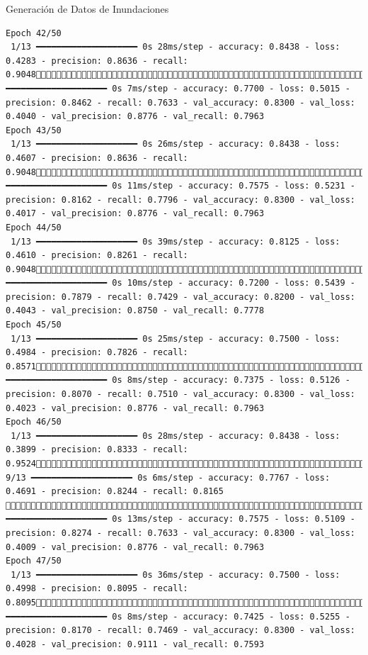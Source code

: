 \documentclass[
  ignorenonframetext,
]{beamer}
\begin{document}
\begin{frame}[fragile]{Generación de Datos de Inundaciones}
\begin{verbatim}
Epoch 42/50
 1/13 ━━━━━━━━━━━━━━━━━━━━ 0s 28ms/step - accuracy: 0.8438 - loss: 0.4283 - precision: 0.8636 - recall: 0.904813/13 ━━━━━━━━━━━━━━━━━━━━ 0s 7ms/step - accuracy: 0.7700 - loss: 0.5015 - precision: 0.8462 - recall: 0.7633 - val_accuracy: 0.8300 - val_loss: 0.4040 - val_precision: 0.8776 - val_recall: 0.7963
Epoch 43/50
 1/13 ━━━━━━━━━━━━━━━━━━━━ 0s 26ms/step - accuracy: 0.8438 - loss: 0.4607 - precision: 0.8636 - recall: 0.904813/13 ━━━━━━━━━━━━━━━━━━━━ 0s 11ms/step - accuracy: 0.7575 - loss: 0.5231 - precision: 0.8162 - recall: 0.7796 - val_accuracy: 0.8300 - val_loss: 0.4017 - val_precision: 0.8776 - val_recall: 0.7963
Epoch 44/50
 1/13 ━━━━━━━━━━━━━━━━━━━━ 0s 39ms/step - accuracy: 0.8125 - loss: 0.4610 - precision: 0.8261 - recall: 0.904813/13 ━━━━━━━━━━━━━━━━━━━━ 0s 10ms/step - accuracy: 0.7200 - loss: 0.5439 - precision: 0.7879 - recall: 0.7429 - val_accuracy: 0.8200 - val_loss: 0.4043 - val_precision: 0.8750 - val_recall: 0.7778
Epoch 45/50
 1/13 ━━━━━━━━━━━━━━━━━━━━ 0s 25ms/step - accuracy: 0.7500 - loss: 0.4984 - precision: 0.7826 - recall: 0.857113/13 ━━━━━━━━━━━━━━━━━━━━ 0s 8ms/step - accuracy: 0.7375 - loss: 0.5126 - precision: 0.8070 - recall: 0.7510 - val_accuracy: 0.8300 - val_loss: 0.4023 - val_precision: 0.8776 - val_recall: 0.7963
Epoch 46/50
 1/13 ━━━━━━━━━━━━━━━━━━━━ 0s 28ms/step - accuracy: 0.8438 - loss: 0.3899 - precision: 0.8333 - recall: 0.9524 9/13 ━━━━━━━━━━━━━━━━━━━━ 0s 6ms/step - accuracy: 0.7767 - loss: 0.4691 - precision: 0.8244 - recall: 0.8165 13/13 ━━━━━━━━━━━━━━━━━━━━ 0s 13ms/step - accuracy: 0.7575 - loss: 0.5109 - precision: 0.8274 - recall: 0.7633 - val_accuracy: 0.8300 - val_loss: 0.4009 - val_precision: 0.8776 - val_recall: 0.7963
Epoch 47/50
 1/13 ━━━━━━━━━━━━━━━━━━━━ 0s 36ms/step - accuracy: 0.7500 - loss: 0.4998 - precision: 0.8095 - recall: 0.809513/13 ━━━━━━━━━━━━━━━━━━━━ 0s 8ms/step - accuracy: 0.7425 - loss: 0.5255 - precision: 0.8170 - recall: 0.7469 - val_accuracy: 0.8300 - val_loss: 0.4028 - val_precision: 0.9111 - val_recall: 0.7593

\end{verbatim}
\end{frame}
\end{document}
